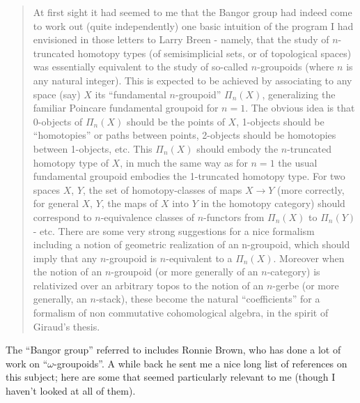 \documentclass{article}
\begin{document}
\begin{quote}
At first sight it had seemed to me that the Bangor group had indeed come
to work out (quite independently) one basic intuition of the program I
had envisioned in those letters to Larry Breen - namely, that the study
of \(n\)-truncated homotopy types (of semisimplicial sets, or of
topological spaces) was essentially equivalent to the study of so-called
\(n\)-groupoids (where \(n\) is any natural integer). This is expected
to be achieved by associating to any space (say) \(X\) its ``fundamental
\(n\)-groupoid'' \(\Pi_n(X)\), generalizing the familiar Poincare
fundamental groupoid for \(n = 1\). The obvious idea is that 0-objects
of \(\Pi_n(X)\) should be the points of \(X\), 1-objects should be
``homotopies'' or paths between points, 2-objects should be homotopies
between 1-objects, etc. This \(\Pi_n(X)\) should embody the
\(n\)-truncated homotopy type of \(X\), in much the same way as for
\(n = 1\) the usual fundamental groupoid embodies the 1-truncated
homotopy type. For two spaces \(X\), \(Y\), the set of homotopy-classes
of maps \(X \to Y\) (more correctly, for general \(X\), \(Y\), the maps
of \(X\) into \(Y\) in the homotopy category) should correspond to
\(n\)-equivalence classes of \(n\)-functors from \(\Pi_n(X)\) to
\(\Pi_n(Y)\) - etc. There are some very strong suggestions for a nice
formalism including a notion of geometric realization of an n-groupoid,
which should imply that any \(n\)-groupoid is \(n\)-equivalent to a
\(\Pi_n(X)\). Moreover when the notion of an \(n\)-groupoid (or more
generally of an \(n\)-category) is relativized over an arbitrary topos
to the notion of an \(n\)-gerbe (or more generally, an \(n\)-stack),
these become the natural ``coefficients'' for a formalism of non
commutative cohomological algebra, in the spirit of Giraud's thesis.
\end{quote}

The ``Bangor group'' referred to includes Ronnie Brown, who has done a
lot of work on ``\(\omega\)-groupoids''. A while back he sent me a nice
long list of references on this subject; here are some that seemed
particularly relevant to me (though I haven't looked at all of them).
\end{document}
